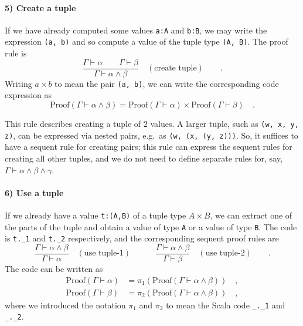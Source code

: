 \paragraph{5) Create a tuple}

If we have already computed some values \lstinline!a:A! and \lstinline!b:B!,
we may write the expression \lstinline!(a, b)! and so compute a value
of the tuple type \lstinline!(A, B)!. The proof rule is
\[
\frac{\Gamma\vdash\alpha\quad\quad\Gamma\vdash\beta}{\Gamma\vdash\alpha\wedge\beta}\quad(\text{create tuple})\quad\quad.
\]
Writing $a\times b$ to mean the pair \lstinline!(a, b)!, we can
write the corresponding code expression as
\[
\text{Proof}\left(\Gamma\vdash\alpha\wedge\beta\right)=\text{Proof}\left(\Gamma\vdash\alpha\right)\times\text{Proof}\left(\Gamma\vdash\beta\right)\quad.
\]

This rule describes creating a tuple of $2$ values. A larger tuple,
such as \lstinline!(w, x, y, z)!, can be expressed via nested pairs,
e.g.~as \lstinline!(w, (x, (y, z)))!. So, it suffices to have a
sequent rule for creating pairs; this rule can express the sequent
rules for creating all other tuples, and we do not need to define
separate rules for, say, $\Gamma\vdash\alpha\wedge\beta\wedge\gamma$.

\paragraph{6) Use a tuple}

If we already have a value \lstinline!t:(A,B)! of a tuple type $A\times B$,
we can extract one of the parts of the tuple and obtain a value of
type \lstinline!A! or a value of type \lstinline!B!. The code is
\lstinline!t._1! and \lstinline!t._2! respectively, and the corresponding
sequent proof rules are
\[
\frac{\Gamma\vdash\alpha\wedge\beta}{\Gamma\vdash\alpha}\quad(\text{use tuple-}1)\quad\quad\quad\frac{\Gamma\vdash\alpha\wedge\beta}{\Gamma\vdash\beta}\quad(\text{use tuple-}2)\quad\quad.
\]
The code can be written as
\begin{align*}
\text{Proof}\left(\Gamma\vdash\alpha\right) & =\pi_{1}\left(\text{Proof}\left(\Gamma\vdash\alpha\wedge\beta\right)\right)\quad,\\
\text{Proof}\left(\Gamma\vdash\beta\right) & =\pi_{2}\left(\text{Proof}\left(\Gamma\vdash\alpha\wedge\beta\right)\right)\quad,
\end{align*}
where we introduced the notation $\pi_{1}$ and $\pi_{2}$ to mean
the Scala code \lstinline!_._1! and \lstinline!_._2!.

